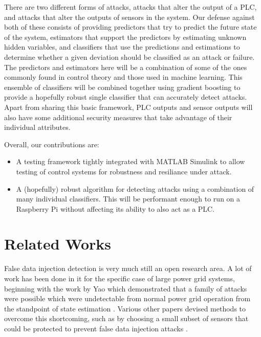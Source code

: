 \documentclass[10pt,twocolumn]{IEEEtran}
\begin{document}
There are two different forms of attacks, attacks that alter the output of a PLC, and attacks that alter the outputs of sensors in the system.
Our defense against both of these consists of providing predictors that try to predict the future state of the system, estimators that support the predictors by estimating unknown hidden variables, and classifiers that use the predictions and estimations to determine whether a given deviation should be classified as an attack or failure.
The predictors and estimators here will be a combination of some of the ones commonly found in control theory and those used in machine learning.
This ensemble of classifiers will be combined together using gradient boosting to provide a hopefully robust single classifier that can accurately detect attacks.
Apart from sharing this basic framework, PLC outputs and sensor outputs will also have some additional security measures that take advantage of their individual attributes.

Overall, our contributions are:
\begin{itemize}
\item A testing framework tightly integrated with MATLAB Simulink to allow testing of control systems for robustness and resiliance under attack.
\item A (hopefully) robust algorithm for detecting attacks using a combination of many individual classifiers.
  This will be performant enough to run on a Raspberry Pi without affecting its ability to also act as a PLC.
\end{itemize}

\section{Related Works} \label{sec:related}
False data injection detection is very much still an open research area.
A lot of work has been done in it for the specific case of large power grid systems, beginning with the work by Yao which demonstrated that a family of attacks were possible which were undetectable from normal power grid operation from the standpoint of state estimation \cite{liu2011false}.
Various other papers devised methods to overcome this shortcoming, such as by choosing a small subset of sensors that could be protected to prevent false data injection attacks \cite{bobba2010detecting}.
\end{document}
